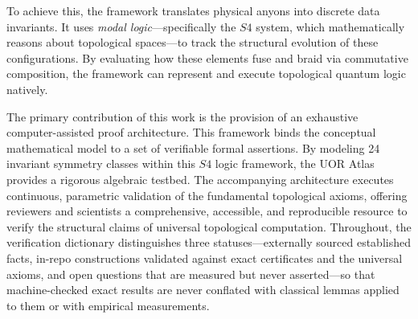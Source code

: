 To achieve this, the framework translates physical anyons into discrete data invariants. It uses \textit{modal logic}—specifically the $S4$ system, which mathematically reasons about topological spaces—to track the structural evolution of these configurations. By evaluating how these elements fuse and braid via commutative composition, the framework can represent and execute topological quantum logic natively.

The primary contribution of this work is the provision of an exhaustive computer-assisted proof architecture. This framework binds the conceptual mathematical model to a set of verifiable formal assertions. By modeling 24 invariant symmetry classes within this $S4$ logic framework, the UOR Atlas provides a rigorous algebraic testbed. The accompanying architecture executes continuous, parametric validation of the fundamental topological axioms, offering reviewers and scientists a comprehensive, accessible, and reproducible resource to verify the structural claims of universal topological computation. Throughout, the verification dictionary distinguishes three statuses---externally sourced established facts, in-repo constructions validated against exact certificates and the universal axioms, and open questions that are measured but never asserted---so that machine-checked exact results are never conflated with classical lemmas applied to them or with empirical measurements.
